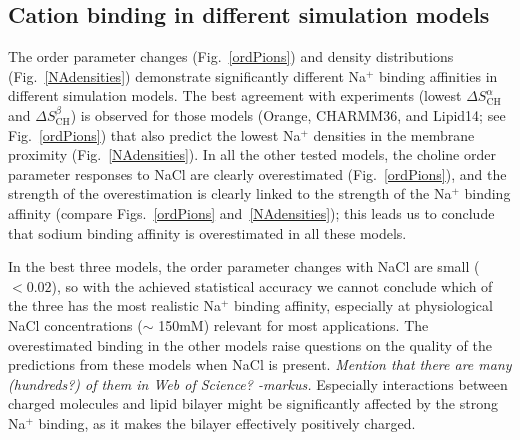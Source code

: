 \documentclass[pre,aps,floatfix,authordate1-4,twocolumn]{revtex4-1}
\begin{document}
\subsection{Cation binding in different simulation models}
The order parameter changes (Fig.~\ref{ordPions}) and density distributions (Fig.~\ref{NAdensities})
demonstrate significantly different Na$^+$ binding affinities in different simulation models.
The best agreement with experiments (lowest $\Delta S_\mathrm{CH}^\alpha$ and $\Delta S_\mathrm{CH}^\beta$) is observed for those models (Orange, CHARMM36, and Lipid14; see Fig.~\ref{ordPions}) that also predict the lowest Na$^+$ densities 
in the membrane proximity (Fig.~\ref{NAdensities}).
In all the other tested models, the choline order parameter 
responses to NaCl are clearly overestimated (Fig.~\ref{ordPions}),
and the strength of the overestimation is clearly linked to the strength of the
Na$^+$ binding affinity (compare Figs.~\ref{ordPions} and~\ref{NAdensities});
this leads us to
conclude that sodium binding affinity is overestimated in all these models.

In the best three models, the order parameter changes with NaCl are small ($<0.02$), so
with the achieved statistical accuracy we cannot conclude 
which of the three has the most realistic Na$^+$ binding affinity,
especially at physiological NaCl concentrations ($\sim$ 150mM) 
relevant for most applications. 
The overestimated binding in the other models raise questions on the quality of the predictions from these models when NaCl is present.
 {\it Mention that there are many (hundreds?) of them in Web of Science? -markus.}
Especially interactions between charged molecules and lipid bilayer might be significantly
affected by the strong Na$^+$ binding, as it makes the bilayer effectively positively charged.

\end{document}
